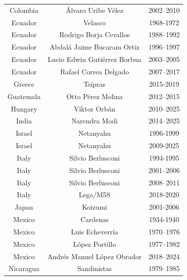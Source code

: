\documentclass{OUP-EJ}
\begin{document}
\begin{table}[h]
{\begin{tabular}{|c|c|c|}
Colombia     & Álvaro Uribe Vélez                            & 2002–2010    \\
Ecuador      & Velasco                                       & 1968-1972    \\
Ecuador      & Rodrigo Borja Cevallos                        & 1988–1992    \\
Ecuador      & Abdalá Jaime Bucaram Ortiz                    & 1996–1997    \\
Ecuador      & Lucio Edwin Gutiérrez Borbua                  & 2003–2005    \\
Ecuador      & Rafael Correa Delgado                         & 2007–2017    \\
Greece       & Tsipras                                       & 2015-2019    \\
Guatemala    & Otto Pérez Molina                             & 2012–2015    \\
Hungary      & Viktor Orbán                                  & 2010–2025    \\
India        & Narendra Modi                                 & 2014–2025    \\
Israel       & Netanyahu                                     & 1996-1999    \\
Israel       & Netanyahu                                     & 2009-2025    \\
Italy        & Silvio Berlusconi                             & 1994-1995    \\
Italy        & Silvio Berlusconi                             & 2001–2006    \\
Italy        & Silvio Berlusconi                             & 2008–2011    \\
Italy        & Lega/M5S                                      & 2018-2020    \\
Japan        & Koizumi                                       & 2001-2006    \\
Mexico       & Cardenas                                      & 1934-1940    \\
Mexico       & Luis Echeverría                               & 1970–1976    \\
Mexico       & López Portillo                                & 1977–1982    \\
Mexico       & Andrés Manuel López Obrador                   & 2018–2024    \\
Nicaragua    & Sandinistas                                   & 1979–1985    \\

\end{tabular}}
\end{table}
\end{document}
